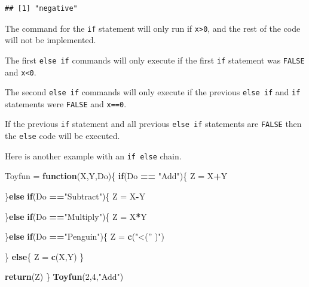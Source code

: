 \documentclass[
]{book}
\newenvironment{Shaded}{\begin{snugshade}}{\end{snugshade}}
\newcommand{\ControlFlowTok}[1]{\textcolor[rgb]{0.13,0.29,0.53}{\textbf{#1}}}
\newcommand{\DecValTok}[1]{\textcolor[rgb]{0.00,0.00,0.81}{#1}}
\newcommand{\KeywordTok}[1]{\textcolor[rgb]{0.13,0.29,0.53}{\textbf{#1}}}
\newcommand{\NormalTok}[1]{#1}
\newcommand{\OperatorTok}[1]{\textcolor[rgb]{0.81,0.36,0.00}{\textbf{#1}}}
\newcommand{\StringTok}[1]{\textcolor[rgb]{0.31,0.60,0.02}{#1}}
\begin{document}
\begin{verbatim}
## [1] "negative"
\end{verbatim}

The command for the \texttt{if} statement will only run if \texttt{x\textgreater{}0}, and the rest of the code will not be implemented.

The first \texttt{else\ if} commands will only execute if the first \texttt{if} statement was \texttt{FALSE} and \texttt{x\textless{}0}.

The second \texttt{else\ if} commands will only execute if the previous \texttt{else\ if} and \texttt{if} statements were \texttt{FALSE} and \texttt{x==0}.

If the previous \texttt{if} statement and all previous \texttt{else\ if} statements are \texttt{FALSE} then the \texttt{else} code will be executed.

Here is another example with an \texttt{if\ else} chain.

\begin{Shaded}
\begin{Highlighting}[]
\NormalTok{Toyfun =}\StringTok{ }\ControlFlowTok{function}\NormalTok{(X,Y,Do)\{}
  \ControlFlowTok{if}\NormalTok{(Do }\OperatorTok{==}\StringTok{ "Add"}\NormalTok{)\{}
\NormalTok{    Z =}\StringTok{ }\NormalTok{X}\OperatorTok{+}\NormalTok{Y}

\NormalTok{  \}}\ControlFlowTok{else} \ControlFlowTok{if}\NormalTok{(Do }\OperatorTok{==}\StringTok{"Subtract"}\NormalTok{)\{}
\NormalTok{    Z =}\StringTok{ }\NormalTok{X}\OperatorTok{-}\NormalTok{Y}

\NormalTok{  \}}\ControlFlowTok{else} \ControlFlowTok{if}\NormalTok{(Do }\OperatorTok{==}\StringTok{"Multiply"}\NormalTok{)\{}
\NormalTok{    Z =}\StringTok{ }\NormalTok{X}\OperatorTok{*}\NormalTok{Y}

    
\NormalTok{  \}}\ControlFlowTok{else} \ControlFlowTok{if}\NormalTok{(Do }\OperatorTok{==}\StringTok{"Penguin"}\NormalTok{)\{}
\NormalTok{    Z =}\StringTok{ }\KeywordTok{c}\NormalTok{(}\StringTok{"<('' )"}\NormalTok{)}
    
\NormalTok{  \} }\ControlFlowTok{else}\NormalTok{\{}
\NormalTok{    Z =}\StringTok{ }\KeywordTok{c}\NormalTok{(X,Y)}
\NormalTok{  \}}
  
  \KeywordTok{return}\NormalTok{(Z)}
\NormalTok{\}}
\KeywordTok{Toyfun}\NormalTok{(}\DecValTok{2}\NormalTok{,}\DecValTok{4}\NormalTok{,}\StringTok{"Add"}\NormalTok{)}
\end{Highlighting}
\end{Shaded}
\end{document}
